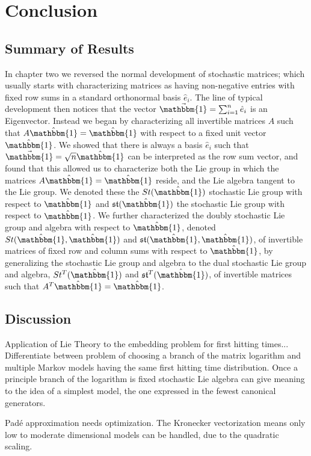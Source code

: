 \chapter{Conclusion}
\section{Summary of Results}
In chapter two we reversed the normal development of stochastic matrices; which
usually starts with characterizing matrices as having non-negative entries with
fixed row sums in a standard orthonormal basis $\hat{e}_i$. The line of typical
development then notices that the vector $\vec{\mathbbm{1}} = \sum_{i=1}^n \hat{e}_i$
is an Eigenvector. Instead we began by characterizing all invertible matrices $A$ 
such that $A \hat{\mathbbm{1}} = \hat{\mathbbm{1}}$ with respect to a fixed unit 
vector $\hat{\mathbbm{1}}$. We showed that there is always a basis $\hat{e}_i$ 
such that $\vec{\mathbbm{1}} = \sqrt{n} \hat{\mathbbm{1}}$ can be interpreted as 
the row sum vector, and found that this allowed us to characterize both the Lie 
group in which the matrices $A \hat{\mathbbm{1}} = \hat{\mathbbm{1}}$ reside, 
and the Lie algebra tangent to the Lie group. We denoted these the $St(\hat{\mathbbm{1}})$ 
stochastic Lie group with respect to $\hat{\mathbbm{1}}$ and $\mathfrak{st}(\hat{\mathbbm{1}})$ 
the stochastic Lie group with respect to $\hat{\mathbbm{1}}$. We further 
characterized the doubly stochastic Lie group and algebra with respect to $\hat{\mathbbm{1}}$, 
denoted $St(\hat{\mathbbm{1}}, \hat{\mathbbm{1}})$ and $\mathfrak{st}(\hat{\mathbbm{1}}, \hat{\mathbbm{1}})$,
of invertible matrices of fixed row and column sums with respect to $\hat{\mathbbm{1}}$,
by generalizing the stochastic Lie group and algebra to the dual stochastic Lie
group and algebra, $St^T(\hat{\mathbbm{1}})$ and $\mathfrak{st}^T(\hat{\mathbbm{1}})$, 
of invertible matrices such that $A^T \hat{\mathbbm{1}} = \hat{\mathbbm{1}}$.
\section{Discussion}
Application of Lie Theory to the embedding problem for first hitting times...
Differentiate between problem of choosing a branch of the matrix logarithm
and multiple Markov models having the same first hitting time distribution.
Once a principle branch of the logarithm is fixed stochastic Lie algebra can 
give meaning to the idea of a simplest model, the one expressed in the fewest 
canonical generators.

Pad\'{e} approximation needs optimization. The Kronecker vectorization means 
only low to moderate dimensional models can be handled, due to the quadratic
scaling.